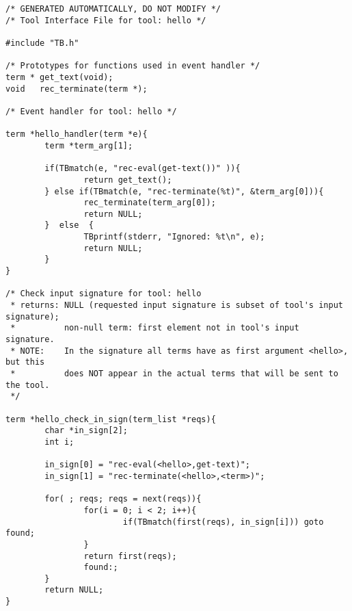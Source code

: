 \begin{verbatim}
/* GENERATED AUTOMATICALLY, DO NOT MODIFY */
/* Tool Interface File for tool: hello */

#include "TB.h"

/* Prototypes for functions used in event handler */
term * get_text(void);
void   rec_terminate(term *);

/* Event handler for tool: hello */

term *hello_handler(term *e){
        term *term_arg[1];

        if(TBmatch(e, "rec-eval(get-text())" )){
                return get_text();
        } else if(TBmatch(e, "rec-terminate(%t)", &term_arg[0])){
                rec_terminate(term_arg[0]);
                return NULL;
        }  else  {
                TBprintf(stderr, "Ignored: %t\n", e);
                return NULL;
        }
}

/* Check input signature for tool: hello
 * returns: NULL (requested input signature is subset of tool's input signature);
 *          non-null term: first element not in tool's input signature.
 * NOTE:    In the signature all terms have as first argument <hello>, but this
 *          does NOT appear in the actual terms that will be sent to the tool.
 */

term *hello_check_in_sign(term_list *reqs){
        char *in_sign[2];
        int i;

        in_sign[0] = "rec-eval(<hello>,get-text)";
        in_sign[1] = "rec-terminate(<hello>,<term>)";

        for( ; reqs; reqs = next(reqs)){
                for(i = 0; i < 2; i++){
                        if(TBmatch(first(reqs), in_sign[i])) goto found;
                }
                return first(reqs);
                found:;
        }
        return NULL;
}
\end{verbatim}
